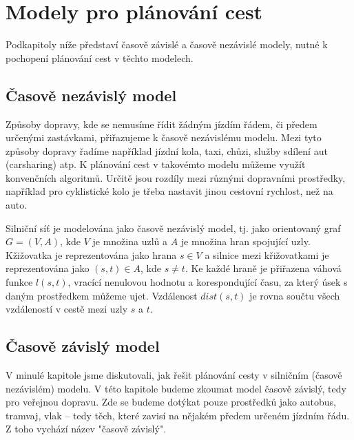 \documentclass[thesis=M,czech]{FITthesis}[2019/12/23]
\theoremstyle{plain}
\theoremstyle{definition}
\begin{document}



\section{Modely pro plánování cest}

Podkapitoly níže představí časově závislé a časově nezávislé modely, nutné k pochopení plánování cest v těchto modelech.

\subsection{Časově nezávislý model}

Způsoby dopravy, kde se nemusíme řídit žádným jízdím řádem, či předem určenými zastávkami, přiřazujeme k časově nezávislému modelu. Mezi tyto způsoby dopravy řadíme například jízdní kola, taxi, chůzi, služby sdílení aut (carsharing) atp. K plánování cest v takovémto modelu můžeme využít konvenčních algoritmů. Určitě jsou rozdíly mezi různými dopravními prostředky, například  pro cyklistické kolo je třeba nastavit jinou cestovní rychlost, než na auto. 


Silniční síť je modelována jako časově nezávislý model, tj. jako orientovaný graf $G = (V, A)$, kde $V$ je množina uzlů a $A$ je množina hran spojující uzly. Kžižovatka je reprezentována jako hrana $ s \in V $ a silnice mezi křižovatkami je reprezentována jako  $ (s, t) \in A $, kde $s \neq t $. Ke každé hraně je přiřazena váhová funkce $l(s, t)$, vracící nenulovou hodnotu a korespondující času, za který úsek s daným prostředkem můžeme ujet. Vzdálenost $dist(s,t)$ je rovna součtu všech vzdáleností v cestě mezi uzly $s$ a $t$. \cite{multimodal-route-planning}



\subsection{Časově závislý model}

V minulé kapitole jsme diskutovali, jak řešit plánování cesty v silničním (časově nezávislém) modelu. V této kapitole budeme zkoumat model časově závislý, tedy pro veřejnou dopravu. Zde se budeme dotýkat pouze prostředků jako autobus, tramvaj, vlak -- tedy těch, které zavisí na nějakém předem určeném jízdním řádu. Z toho vychází název "časově závislý".
\end{document}
